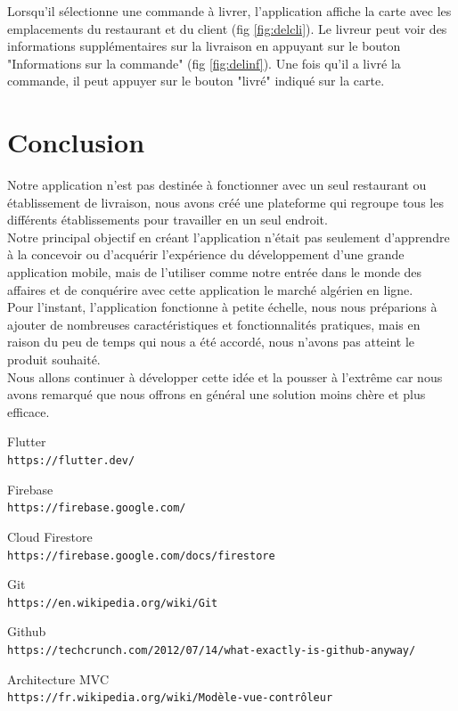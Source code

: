 \documentclass[french, a4paper, 12pt]{report}
\begin{document}
		Lorsqu'il sélectionne une commande à livrer, l'application affiche la carte avec les emplacements du restaurant et du client (fig \ref{fig:delcli}). Le livreur peut voir des informations supplémentaires sur la livraison en appuyant sur le bouton "Informations sur la commande" (fig \ref{fig:delinf}).
Une fois qu'il a livré la commande, il peut appuyer sur le bouton "livré" indiqué sur la carte.

\newpage
\chapter*{Conclusion}
Notre application n'est pas destinée à fonctionner avec un seul restaurant ou établissement de livraison, nous avons créé une plateforme qui regroupe tous les différents établissements pour travailler en un seul endroit.\\


Notre principal objectif en créant l'application n'était pas seulement d'apprendre à la concevoir ou d'acquérir l'expérience du développement d'une grande application mobile, mais de l'utiliser comme notre entrée dans le monde des affaires et de conquérire avec cette application le marché algérien en ligne.\\


Pour l'instant, l'application fonctionne à petite échelle, nous nous préparions à ajouter de nombreuses caractéristiques et fonctionnalités pratiques, mais en raison du peu de temps qui nous a été accordé, nous n'avons pas atteint le produit souhaité.\\


Nous allons continuer à développer cette idée et la pousser à l'extrême car nous avons remarqué que nous offrons en général une solution moins chère et plus efficace.


\newpage
\begin{thebibliography}{9}

  Flutter
  \\\texttt{https://flutter.dev/}

  Firebase
  \\\texttt{https://firebase.google.com/}

  Cloud Firestore
  \\\texttt{https://firebase.google.com/docs/firestore}

  Git
  \\\texttt{https://en.wikipedia.org/wiki/Git}

  Github
  \\\texttt{https://techcrunch.com/2012/07/14/what-exactly-is-github-anyway/}

  Architecture MVC
  \\\texttt{https://fr.wikipedia.org/wiki/Modèle-vue-contrôleur}

\end{thebibliography}
\end{document}
